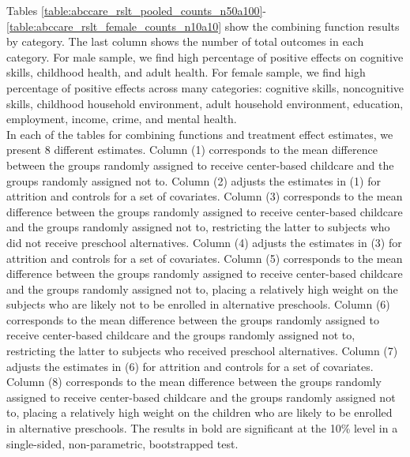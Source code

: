 \noindent Tables \ref{table:abccare_rslt_pooled_counts_n50a100}-\ref{table:abccare_rslt_female_counts_n10a10} show the combining function results by category. The last column shows the number of total outcomes in each category. For male sample, we find high percentage of positive effects on cognitive skills, childhood health, and adult health. For female sample, we find high percentage of positive effects across many categories: cognitive skills, noncognitive skills, childhood household environment, adult household environment, education, employment, income, crime, and mental health. \\

\noindent In each of the tables for combining functions and treatment effect estimates, we present 8 different estimates. Column (1) corresponds to the mean difference between the groups randomly assigned to receive center-based childcare and the groups randomly assigned not to. Column (2) adjusts the estimates in (1) for attrition and controls for a set of covariates. Column (3) corresponds to the mean difference between the groups randomly assigned to receive center-based childcare and the groups randomly assigned not to, restricting the latter to subjects who did not receive preschool alternatives. Column (4) adjusts the estimates in (3) for attrition and controls for a set of covariates. Column (5) corresponds to the mean difference between the groups randomly assigned to receive center-based childcare and the groups randomly assigned not to, placing a relatively high weight on the subjects who are likely not to be enrolled in alternative preschools. Column (6) corresponds to the mean difference between the groups randomly assigned to receive center-based childcare and the groups randomly assigned not to, restricting the latter to subjects who received preschool alternatives. Column (7) adjusts the estimates in (6) for attrition and controls for a set of covariates. Column (8) corresponds to the mean difference between the groups randomly assigned to receive center-based childcare and the groups randomly assigned not to, placing a relatively high weight on the children who are likely to be enrolled in alternative preschools. The results in bold are significant at the 10\% level in a single-sided, non-parametric, bootstrapped test. \\





%
%
%
%
%
%


